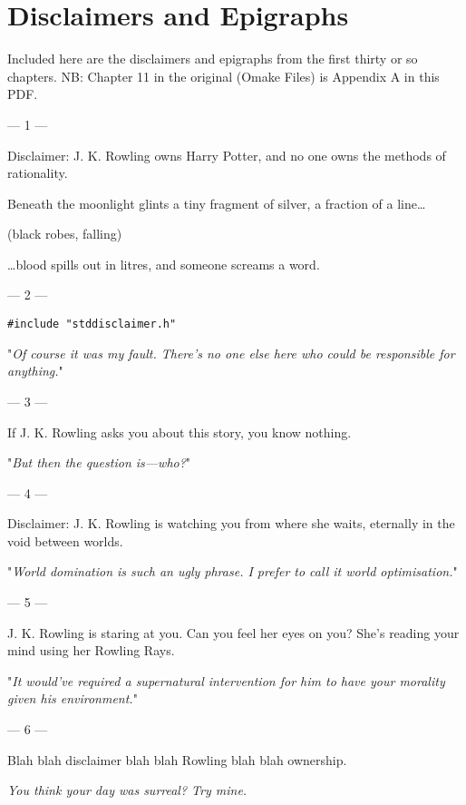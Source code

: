 \chapter{Disclaimers and Epigraphs}

Included here are the disclaimers and epigraphs from the first thirty or so
chapters. NB: Chapter 11 in the original (Omake Files) is Appendix A in this PDF.

\sbreak
{ %
\setlength{\parindent}{0pt}
\setlength{\parskip}{1em}

\filbreak
--- 1 ---

Disclaimer: J. K. Rowling owns Harry Potter, and no one owns the methods of rationality.

\begin{em}
Beneath the moonlight glints a tiny fragment of silver, a fraction of a line{\ldots}

(black robes, falling)

{\ldots}blood spills out in litres, and someone screams a word.
\end{em}

\filbreak
--- 2 ---

\texttt{\#include "stddisclaimer.h"}

"\emph{Of course it was my fault. There's no one else here who could be 
responsible for anything.}"

\filbreak
--- 3 ---

If J. K. Rowling asks you about this story, you know nothing.

"\emph{But then the question is---who?}"

\filbreak
--- 4 ---

Disclaimer: J. K.
Rowling is watching you from where she waits, eternally in the void between
worlds.

"\emph{World domination is such an ugly phrase. I prefer to call it world
optimisation.}"

\filbreak
--- 5 ---

J. K. Rowling is
staring at you. Can you feel her eyes on you? She's reading your mind using her
Rowling Rays.

"\emph{It would've required a \emph{supernatural intervention} for him to have
\emph{your} morality given \emph{his} environment.}"

\filbreak
--- 6 ---

Blah blah
disclaimer blah blah Rowling blah blah ownership.

\emph{You think your day was surreal? Try mine.}

}
